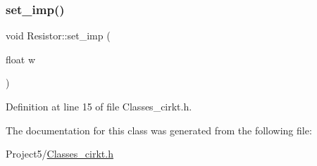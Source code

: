 \subsubsection{\texorpdfstring{set\+\_\+imp()}{set\_imp()}}
{\footnotesize\ttfamily void Resistor\+::set\+\_\+imp (\begin{DoxyParamCaption}\item[{float}]{w }\end{DoxyParamCaption})}



Definition at line 15 of file Classes\+\_\+cirkt.\+h.



The documentation for this class was generated from the following file\+:\begin{DoxyCompactItemize}
\item 
Project5/\mbox{\hyperlink{_classes__cirkt_8h}{Classes\+\_\+cirkt.\+h}}\end{DoxyCompactItemize}
